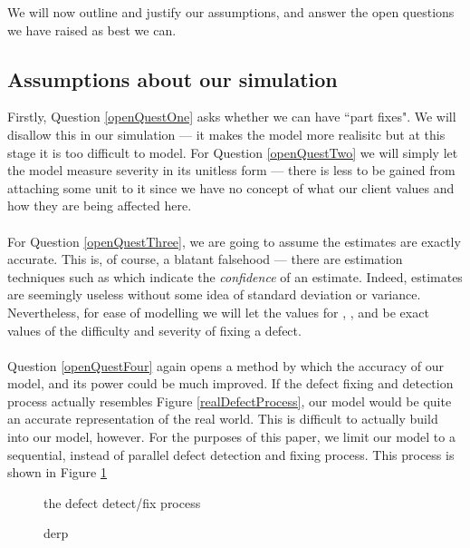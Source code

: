 We will now outline and justify our assumptions, and answer the open questions we have raised as
best we can.

\subsection{Assumptions about our simulation}

Firstly, Question \ref{openQuestOne} asks whether we can have ``part fixes".
We will disallow this in our simulation --- it makes the model more realisitc but at this stage it
is too difficult to model.
For Question \ref{openQuestTwo} we will simply let the model measure severity in its
unitless form --- there is less to be gained from attaching some unit to it since we have no concept
of what our client values and how they are being affected here.\\
\\
For Question \ref{openQuestThree}, we are going to assume the estimates are exactly accurate.
This is, of course, a blatant falsehood --- there are estimation techniques such as \FIXME which
indicate the {\em confidence} of an estimate.
Indeed, estimates are seemingly useless without some idea of standard deviation or variance.
Nevertheless, for ease of modelling we will let the values for \easy, \hard, \minor and \major be
exact values of the difficulty and severity of fixing a defect.\\
\\
Question \ref{openQuestFour} again opens a method by which the accuracy of our model, and its power
could be much improved.
If the defect fixing and detection process actually resembles Figure \ref{realDefectProcess}, our
model would be quite an accurate representation of the real world.
This is difficult to actually build into our model, however.
For the purposes of this paper, we limit our model to a sequential, instead of parallel defect
detection and fixing process.
This process is shown in Figure \ref{fakeDefectProcess}

\begin{figure}[ht!]
	\FIXME the defect detect/fix process
	\caption{derp} \label{fakeDefectProcess}
\end{figure}

